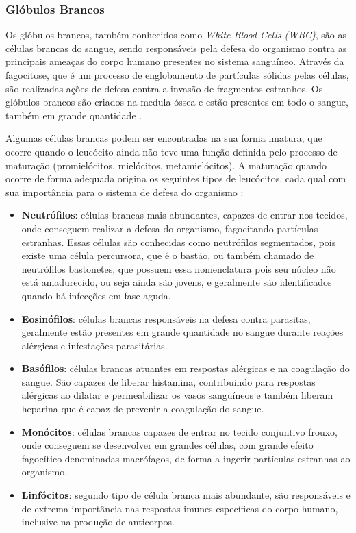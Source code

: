 \subsubsection{Glóbulos Brancos}
Os glóbulos brancos, também conhecidos como \emph{White Blood Cells (WBC)}, são as células brancas do sangue, sendo responsáveis pela defesa do organismo contra as principais ameaças do corpo humano presentes no sistema sanguíneo. Através da fagocitose, que é um processo de englobamento de partículas sólidas pelas células, são realizadas ações de defesa contra a invasão de fragmentos estranhos. Os glóbulos brancos são criados na medula óssea e estão presentes em todo o sangue, também em grande quantidade \cite{abcOfCbc}.

Algumas células brancas podem ser encontradas na sua forma imatura, que ocorre quando o leucócito ainda não teve uma função definida pelo processo de maturação (promielócitos, mielócitos, metamielócitos). A maturação quando ocorre de forma adequada origina os seguintes tipos de leucócitos, cada qual com sua importância para o sistema de defesa do organismo \cite{manualHematologia}:

\begin{itemize}
	\item \textbf{Neutrófilos}: células brancas mais abundantes, capazes de entrar nos tecidos, onde conseguem realizar a defesa do organismo, fagocitando partículas estranhas. Essas células são conhecidas como neutrófilos segmentados, pois existe uma célula percursora, que é o bastão, ou também chamado de neutrófilos bastonetes, que possuem essa nomenclatura pois seu núcleo não está amadurecido, ou seja ainda são jovens, e geralmente são identificados quando há infecções em fase aguda. 
	\item \textbf{Eosinófilos}: células brancas responsáveis na defesa contra parasitas, geralmente estão presentes em grande quantidade no sangue durante reações alérgicas e infestações parasitárias.
	\item \textbf{Basófilos}: células brancas atuantes em respostas alérgicas e na coagulação do sangue. São capazes de liberar histamina, contribuindo para respostas alérgicas ao dilatar e permeabilizar os vasos sanguíneos e também liberam heparina que é capaz de prevenir a coagulação do sangue.
	\item \textbf{Monócitos}: células brancas capazes de entrar no tecido conjuntivo frouxo, onde conseguem se desenvolver em grandes células, com grande efeito fagocítico denominadas macrófagos, de forma a ingerir partículas estranhas ao organismo.
	\item \textbf{Linfócitos}: segundo tipo de célula branca mais abundante, são responsáveis e de extrema importância nas respostas imunes específicas do corpo humano, inclusive na produção de anticorpos.
\end{itemize}

